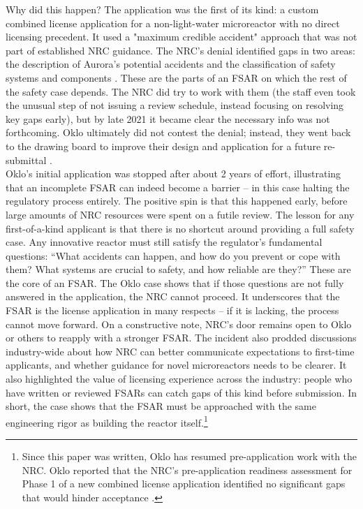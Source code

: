\documentclass[5p,authoryear]{elsarticle}
\begin{document}
Why did this happen? The application was the first of its kind: a custom combined license application for a non-light-water microreactor with no direct licensing precedent. It used a "maximum credible accident" approach that was not part of established NRC guidance. The NRC's denial identified gaps in two areas: the description of Aurora's potential accidents and the classification of safety systems and components \cite{NRC2022Oklo}. These are the parts of an FSAR on which the rest of the safety case depends. The NRC did try to work with them (the staff even took the unusual step of not issuing a review schedule, instead focusing on resolving key gaps early), but by late 2021 it became clear the necessary info was not forthcoming. Oklo ultimately did not contest the denial; instead, they went back to the drawing board to improve their design and application for a future re-submittal \cite{WNN2022}. \\

Oklo's initial application was stopped after about 2 years of effort, illustrating that an incomplete FSAR can indeed become a barrier – in this case halting the regulatory process entirely. The positive spin is that this happened early, before large amounts of NRC resources were spent on a futile review. The lesson for any first-of-a-kind applicant is that there is no shortcut around providing a full safety case. Any innovative reactor must still satisfy the regulator’s fundamental questions: “What accidents can happen, and how do you prevent or cope with them? What systems are crucial to safety, and how reliable are they?” These are the core of an FSAR. The Oklo case shows that if those questions are not fully answered in the application, the NRC cannot proceed. It underscores that the FSAR is the license application in many respects – if it is lacking, the process cannot move forward. On a constructive note, NRC’s door remains open to Oklo or others to reapply with a stronger FSAR. The incident also prodded discussions industry-wide about how NRC can better communicate expectations to first-time applicants, and whether guidance for novel microreactors needs to be clearer. It also highlighted the value of licensing experience across the industry: people who have written or reviewed FSARs can catch gaps of this kind before submission. In short, the case shows that the FSAR must be approached with the same engineering rigor as building the reactor itself.\footnote{Since this paper was written, Oklo has resumed pre-application work with the NRC. Oklo reported that the NRC's pre-application readiness assessment for Phase 1 of a new combined license application identified no significant gaps that would hinder acceptance \cite{NRC2025OkloReadiness, Oklo2025Readiness}.}
\end{document}
